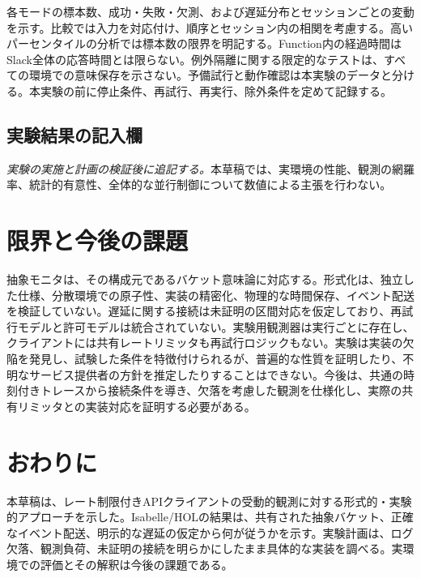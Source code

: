 \documentclass[10pt,twocolumn]{ltjsarticle}
\begin{document}
各モードの標本数、成功・失敗・欠測、および遅延分布とセッションごとの変動を示す。比較では入力を対応付け、順序とセッション内の相関を考慮する。高いパーセンタイルの分析では標本数の限界を明記する。Function内の経過時間はSlack全体の応答時間とは限らない。例外隔離に関する限定的なテストは、すべての環境での意味保存を示さない。予備試行と動作確認は本実験のデータと分ける。本実験の前に停止条件、再試行、再実行、除外条件を定めて記録する。

\subsection{実験結果の記入欄}
\emph{実験の実施と計画の検証後に追記する。}本草稿では、実環境の性能、観測の網羅率、統計的有意性、全体的な並行制御について数値による主張を行わない。

\section{限界と今後の課題}
抽象モニタは、その構成元であるバケット意味論に対応する。形式化は、独立した仕様、分散環境での原子性、実装の精密化、物理的な時間保存、イベント配送を検証していない。遅延に関する接続は未証明の区間対応を仮定しており、再試行モデルと許可モデルは統合されていない。実験用観測器は実行ごとに存在し、クライアントには共有レートリミッタも再試行ロジックもない。実験は実装の欠陥を発見し、試験した条件を特徴付けられるが、普遍的な性質を証明したり、不明なサービス提供者の方針を推定したりすることはできない。今後は、共通の時刻付きトレースから接続条件を導き、欠落を考慮した観測を仕様化し、実際の共有リミッタとの実装対応を証明する必要がある。

\section{おわりに}
本草稿は、レート制限付きAPIクライアントの受動的観測に対する形式的・実験的アプローチを示した。Isabelle/HOLの結果は、共有された抽象バケット、正確なイベント配送、明示的な遅延の仮定から何が従うかを示す。実験計画は、ログ欠落、観測負荷、未証明の接続を明らかにしたまま具体的な実装を調べる。実環境での評価とその解釈は今後の課題である。

\small


\end{document}

